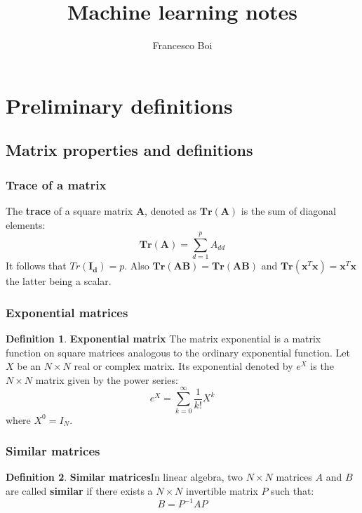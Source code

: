 \documentclass[12pt, letterpaper]{article}
\theoremstyle{definition}
\newtheorem{definition}{Definition}[section]
\newcommand{\Tr}{\mathbf{Tr}}
\newcommand{\x}{\mathbf{x}}
\let\tb\textbf
\begin{document}
\title{Machine learning notes}
\author{Francesco Boi}
\date{\vspace{-5ex}}
\maketitle
{}
\tableofcontents
\section{Preliminary definitions}
\subsection{Matrix properties and definitions}
\subsubsection{Trace of a matrix}
\label{trace}
The \textbf{trace} of a square matrix $\mathbf{A}$, denoted as $\Tr(\mathbf{A})$ is the sum of diagonal elements:
\begin{equation}
\Tr(\mathbf{A}) = \sum_{d=1}^p A_{dd}
\end{equation}
It follows that $Tr(\mathbf{I_d}) = p$.
Also $\Tr(\mathbf{AB}) = \Tr(\mathbf{AB})$ and $\Tr(\x^T\x) = \x^T\x$ the latter being a scalar.

\subsubsection{Exponential matrices}
\label{ExponentialMatrices}
\begin{definition}{\tb{Exponential matrix}} The matrix exponential is a matrix function on square matrices analogous to the ordinary exponential function. Let $X$ be an $N\times N$ real or complex matrix. Its exponential denoted by $e^X$ is the $N \times N$ matrix given by the power series:
\begin{equation}
e^X = \sum_{k=0}^\infty \frac{1}{k!} X^k
\end{equation}
where $X^0 = I_N$.
\end{definition}

\subsubsection{Similar matrices}
\label{MatrixSimilarity}
\begin{definition}{\tb{Similar matrices}}In linear algebra, two $N\times N$ matrices $A$ and $B$ are called \tb{similar} if there exists a $N\times N$ invertible matrix $P$ such that:
\begin{equation}
B = P^{-1}AP
\end{equation}	
\end{definition}
\end{document}
